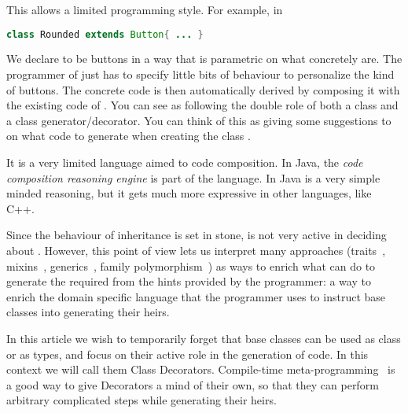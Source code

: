 This allows a limited programming style.
For example, in

\begin{lstlisting}[language=Java]
class Rounded extends Button{ ... }
\end{lstlisting}

We declare \Q@Rounded@s to be buttons in a way that
is parametric on what \Q@Button@s concretely are.
The programmer of \Q@Rounded@ just has to specify little bits
of behaviour to personalize the kind of buttons.
The concrete code is then automatically derived
by composing it with the existing code of \Q@Button@.
You can see \Q@Button@s as
following the double role of both a class and a class generator/decorator.
You can think of this as giving some suggestions to \Q@Button@
on what code to generate when creating the class \Q@Rounded@.

It is a very limited language aimed to code composition.
In Java,  the \emph{code composition reasoning engine} is part of the language.
In Java is a very simple minded reasoning, but it gets much more expressive in other languages, like C++.

Since the behaviour of inheritance
is set in stone, \Q@Button@ is not very active in deciding
about \Q@Rounded@.
However, this point of view lets us interpret many approaches
(traits~\cite{scharli2003traits}, mixins~\cite{smaragdakis2000mixin}, generics~\cite{igarashi2001featherweight}, family polymorphism~\cite{ernst2001family})
as ways to enrich what \Q@Button@ can do to generate the
required \Q@Rounded@ from the hints provided by the programmer:
a way to enrich the domain specific language
that the programmer uses to instruct base classes into generating their heirs.

In this article we wish to temporarily forget that base classes can be used as class or as types, and
focus on their active role in the generation
of code. In this context we will call them Class Decorators.
Compile-time meta-programming~\cite{sheard2002template} is a good way to give Decorators
a mind of their own, so that they can perform arbitrary
complicated steps while generating their heirs.



